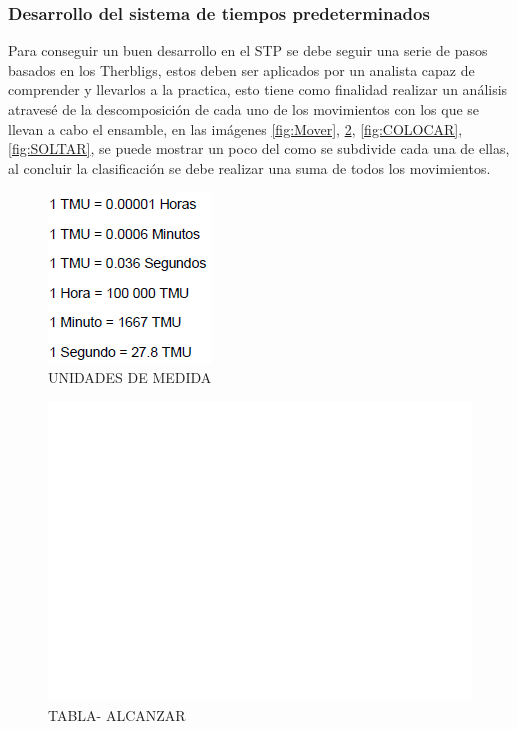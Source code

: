     \subsubsection{Desarrollo del sistema de tiempos predeterminados}
    Para conseguir un buen desarrollo en el STP se debe seguir una serie de pasos basados en los Therbligs, estos deben ser aplicados por un analista capaz de comprender y llevarlos a la practica, esto tiene como finalidad realizar un análisis atravesé de la descomposición de cada uno de los movimientos con los que se llevan a cabo el ensamble, en las imágenes \ref{fig:Mover}, \ref{fig:Alcanzar}, \ref{fig:COLOCAR}, \ref{fig:SOLTAR}, se puede mostrar un poco del como se subdivide cada una de ellas, al concluir la clasificación se debe realizar una suma de todos los movimientos. 
    \begin{figure}
        \centering
        \includegraphics[trim = {0mm 00mm 0mm 0mm},clip,scale=0.5]{24/Img/unidadesdeMedida(MTM).png}
        \caption{UNIDADES DE MEDIDA}
        \label{fig:Unidades}
    \end{figure}
    \begin{figure}
        \centering
        \includegraphics[trim = {0mm 00mm 0mm 15mm},clip,scale=0.3]{24/Img/tablaAlcanzar.pdf}
        \caption{TABLA- ALCANZAR}
        \label{fig:Alcanzar}
    \end{figure}
